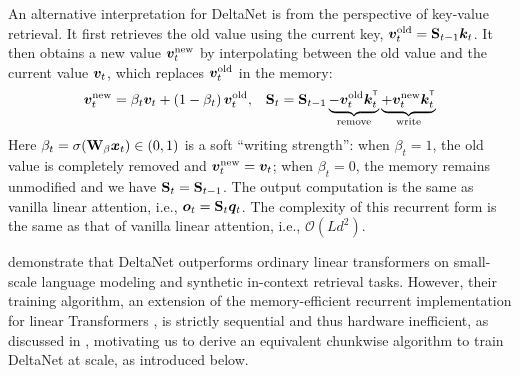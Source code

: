 An alternative  interpretation for DeltaNet is from the perspective of key-value retrieval. It first retrieves the old value using the current key, ${\bm{v}}_{t}^{\text{old}}={\mathbf{S}}_{t-1}{\bm{k}}_t$. 
It then obtains a new value ${\bm{v}}_{t}^{\text{new}}$ by interpolating between the old value and the current value ${\bm{v}}_t$, which replaces ${\bm{v}}_{t}^{\text{old}}$ in the memory:
\begin{align*}
&\vv_{t}^{\text{new}} = \beta_t \vv_t + \left(1-\beta_t\right) \vv_t^{\text{old}}, &\rmS_t = \rmS_{t-1} \underbrace{ -\vv_t^{\text{old}}\vk_t^\intercal}_{\text{remove}}\underbrace{+\vv_t^{\text{new} }\vk_t^\intercal}_{\text{write}}
\end{align*}
Here  $\beta_t = \sigma({\mathbf{W}}_{\beta}{\bm{x}}_t) \in (0,1)$ is a soft ``writing strength'': when $\beta_t=1$, the old value is completely removed and ${\bm{v}}_t^{\text{new}}={\bm{v}}_t$; when $\beta_t=0$, the memory remains unmodified and we have ${\mathbf{S}}_{t} = {\mathbf{S}}_{t-1}$. 
The output computation is the same as vanilla linear attention, i.e., ${\bm{o}}_{t} = {\mathbf{S}}_t {\bm{q}}_t$. 
The complexity of this recurrent form is the same as that of vanilla linear attention, i.e., $\mathcal{O}(Ld^2)$. 

\citet{schlag_linear_2021} demonstrate that DeltaNet outperforms ordinary linear transformers on small-scale language modeling and synthetic in-context retrieval tasks. However, their training algorithm, an extension of the memory-efficient recurrent implementation for linear Transformers \citep[\S 3.3.1]{katharopoulos_transformers_2020}, is strictly sequential and thus hardware inefficient, as discussed in \citep[\S 3.2]{yang_gated_2023}, motivating us to derive an equivalent chunkwise algorithm to train DeltaNet at scale, as introduced below.

